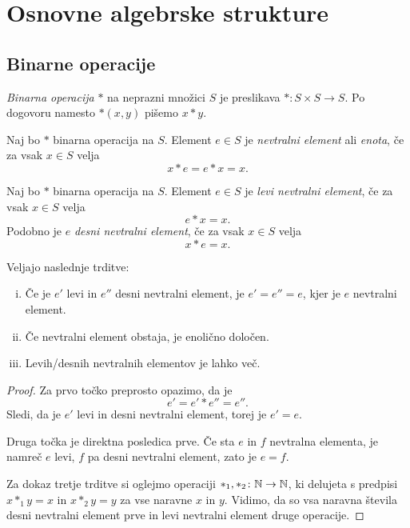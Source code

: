 \section{Osnovne algebrske strukture}

\subsection{Binarne operacije}

\begin{definicija}
\emph{Binarna operacija} $*$ na neprazni
množici $S$ je preslikava $*\colon S\times S\to S$. Po dogovoru
namesto $*(x,y)$ pišemo $x*y$.
\end{definicija}

\begin{definicija}
Naj bo $*$ binarna operacija na $S$. Element $e\in S$ je
\emph{nevtralni element}
ali \emph{enota}, če za vsak $x\in S$ velja
\[
x*e=e*x=x.
\]
\end{definicija}

\begin{definicija}
Naj bo $*$ binarna operacija na $S$. Element $e\in S$ je \emph{levi
nevtralni element}, če za vsak $x\in S$ velja
\[
e*x=x.
\]
Podobno je $e$ \emph{desni nevtralni element}, če za vsak $x\in S$
velja
\[
x*e=x.
\]
\end{definicija}

\begin{trditev}
Veljajo naslednje trditve:

\begin{enumerate}[i)]
\item Če je $e'$ levi in $e''$ desni nevtralni element, je
$e'=e''=e$, kjer je $e$ nevtralni element.
\item Če nevtralni element obstaja, je enolično določen.
\item Levih/desnih nevtralnih elementov je lahko več.
\end{enumerate}
\end{trditev}

\begin{proof}
Za prvo točko preprosto opazimo, da je
\[
e'=e'*e''=e''.
\]
Sledi, da je $e'$ levi in desni nevtralni element, torej je $e'=e$.

Druga točka je direktna posledica prve. Če sta $e$ in $f$ nevtralna
elementa, je namreč $e$ levi, $f$ pa desni nevtralni element, zato
je $e=f$.

Za dokaz tretje trditve si oglejmo operaciji
$*_1,*_2\colon\mathbb{N}\to\mathbb{N}$, ki delujeta s predpisi $x*_1y=x$ in
$x*_2y=y$ za vse naravne $x$ in $y$. Vidimo, da so vsa naravna
števila desni nevtralni element prve in levi nevtralni element
druge operacije.
\end{proof}

